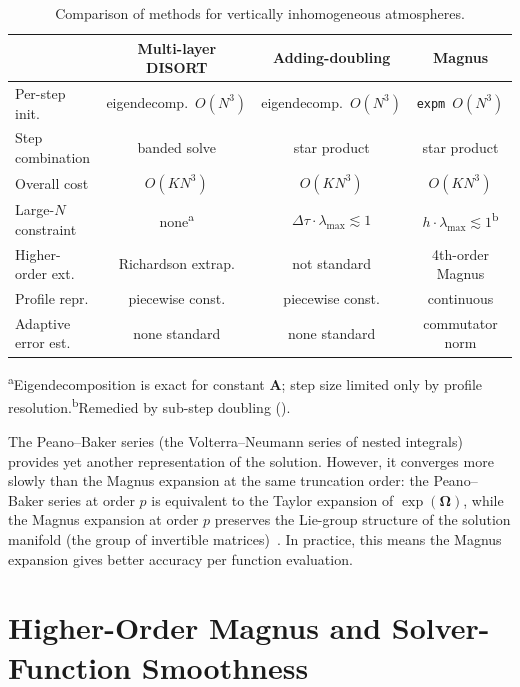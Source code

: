\documentclass[11pt,a4paper]{article}
\newcommand{\mat}[1]{\mathbf{#1}}
\theoremstyle{definition}
\begin{document}
\begin{table}[h]\centering
\caption{Comparison of methods for vertically inhomogeneous atmospheres.}
\label{tab:comparison}
\begin{tabular}{lccc}
\toprule
& \textbf{Multi-layer DISORT} & \textbf{Adding-doubling} & \textbf{Magnus} \\
\midrule
Per-step init.
  & eigendecomp.\ $O(N^3)$
  & eigendecomp.\ $O(N^3)$
  & \texttt{expm}\ $O(N^3)$ \\
Step combination
  & banded solve
  & star product
  & star product \\
Overall cost
  & $O(K N^3)$
  & $O(K N^3)$
  & $O(K N^3)$ \\
Large-$N$ constraint
  & none\textsuperscript{a}
  & $\Delta\tau\!\cdot\!\lambda_{\max}\!\lesssim\!1$
  & $h\!\cdot\!\lambda_{\max}\!\lesssim\!1$\textsuperscript{b} \\
Higher-order ext.
  & Richardson extrap.
  & not standard
  & 4th-order Magnus \\
Profile repr.
  & piecewise const.
  & piecewise const.
  & continuous \\
Adaptive error est.
  & none standard
  & none standard
  & commutator norm \\
\bottomrule
\end{tabular}
\par\smallskip
{\footnotesize\textsuperscript{a}Eigendecomposition is exact for
constant $\mat{A}$; step size limited only by profile
resolution.\quad\textsuperscript{b}Remedied by sub-step doubling
().}
\end{table}

The Peano--Baker series (the Volterra--Neumann series of nested
integrals) provides yet another representation of the
solution.  However, it converges more slowly than the Magnus expansion
at the same truncation order: the Peano--Baker series at order $p$
is equivalent to the Taylor expansion of $\exp(\mat{\Omega})$, while
the Magnus expansion at order $p$ preserves the Lie-group structure
of the solution manifold (the group of invertible
matrices)~\cite{iserles2000,blanes2009}.  In practice, this means the
Magnus expansion gives better accuracy per function evaluation.


\section{Higher-Order Magnus and Solver-Function Smoothness}
\label{sec:higher_order}
\end{document}
